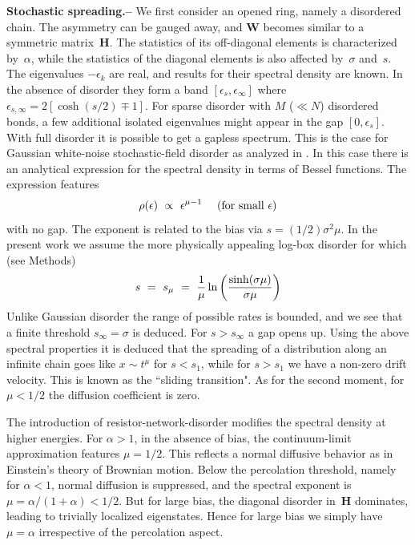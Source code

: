 \documentclass[aps,pre,floats,floatfix,twocolumn]{revtex4}
\newcommand{\be}[1]{\begin{eqnarray}\ifthenelse{#1=-1}{\nonumber}{\ifthenelse{#1=0}{}{\label{e#1}}}}
\newcommand{\eeq}{\end{eqnarray}}
\newcommand{\Ap}[1]{\textcolor{blue}{{appendix}\!~(\ref{#1})}}
\newcommand{\sect}[1]{{\bf #1.-- }}
\begin{document}
\sect{Stochastic spreading}
%
We first consider an opened ring, namely a disordered chain. 
The asymmetry can be gauged away, and $\bm{W}$ becomes similar 
to a symmetric matrix~$\bm{H}$. The statistics of its off-diagonal elements 
is characterized by~$\alpha$, 
while the statistics of the diagonal elements 
is also affected by~$\sigma$ and~$s$.   
The eigenvalues ${-\epsilon_k}$ are real, 
and  results for their spectral density are known.
In the absence of disorder they form a band ${[\epsilon_s,\epsilon_{\infty}]}$
where ${\epsilon_{s,\infty}=2[\cosh(s/2)\mp1]}$. 
%
For sparse disorder with $M$ ($\ll N$) disordered bonds, 
a few additional isolated eigenvalues might appear 
in the gap ${[0,\epsilon_s]}$.
%
With full disorder it is possible to get a gapless spectrum. 
This is the case for Gaussian white-noise stochastic-field disorder 
as analyzed in \cite{odh3}. %
In this case there is an analytical expression 
for the spectral density in terms of Bessel functions.
The expression features 
%
\be{3}
\rho(\epsilon) \ \propto \ \epsilon^{\mu-1} \ \ \ \ \text{(for small $\epsilon$)}
\eeq
%
with no gap. 
The exponent is related to the bias via ${s=(1/2) \sigma^2 \mu}$. 
%
In the present work we assume the more physically appealing log-box 
disorder for which (see Methods)
%
\be{5}
s \ = \ s_{\mu} \ = \ \frac{1}{\mu} \ln\left( \frac{\sinh (\sigma\mu)}{\sigma\mu} \right)
\eeq
%
Unlike Gaussian disorder the range of possible rates is bounded,  
and we see that a finite threshold ${s_{\infty}=\sigma}$ is deduced.
For ${s>s_{\infty}}$ a gap opens up. 
%
Using the above spectral properties it is deduced that the  
spreading of a distribution along an infinite chain 
goes like $x\sim t^{\mu}$ for ${s<s_1}$, 
while for $s>s_1$ we have a non-zero drift velocity.
This is known as the ``sliding transition".
As for the second moment, for ${\mu<1/2}$ 
the diffusion coefficient is zero. 

The introduction of resistor-network-disorder modifies 
the spectral density at higher energies.
For ${\alpha>1}$, in the absence of bias, 
the continuum-limit approximation features ${\mu=1/2}$.
This reflects a normal diffusive behavior 
as in Einstein's theory of Brownian motion. 
Below the percolation threshold, namely for ${\alpha<1}$,
normal diffusion is suppressed, 
and the spectral exponent is ${\mu=\alpha/(1{+}\alpha)<1/2}$. 
But for large bias, the diagonal disorder in~$\bm{H}$ dominates,  
leading to trivially localized eigenstates. 
Hence for large bias we simply have ${\mu=\alpha}$
irrespective of the percolation aspect.  
\end{document}
